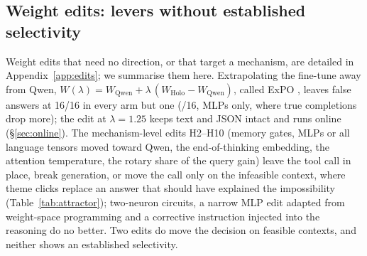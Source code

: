 \subsection{Weight edits: levers without established selectivity}
\label{sec:levers}
Weight edits that need no direction, or that target a mechanism, are detailed in Appendix~\ref{app:edits}; we summarise them here. Extrapolating the fine-tune away from Qwen, $W(\lambda)=W_{\text{Qwen}}+\lambda\,(W_{\text{Holo}}-W_{\text{Qwen}})$, called ExPO \citep{zheng2024expo}, leaves false answers at 16/16 in every arm but one (\expoFspMin/16, MLPs only, where true completions drop more); the edit at $\lambda=1.25$ keeps text and JSON intact and runs online (\S\ref{sec:online}). The mechanism-level edits H2--H10 (memory gates, MLPs or all language tensors moved toward Qwen, the end-of-thinking embedding, the attention temperature, the rotary share of the query gain) leave the tool call in place, break generation, or move the call only on the infeasible context, where theme clicks replace an answer that should have explained the impossibility (Table~\ref{tab:attractor}); two-neuron circuits, a narrow MLP edit adapted from weight-space programming \citep{takehi2026wsp} and a corrective instruction injected into the reasoning do no better. Two edits do move the decision on feasible contexts, and neither shows an established selectivity.


